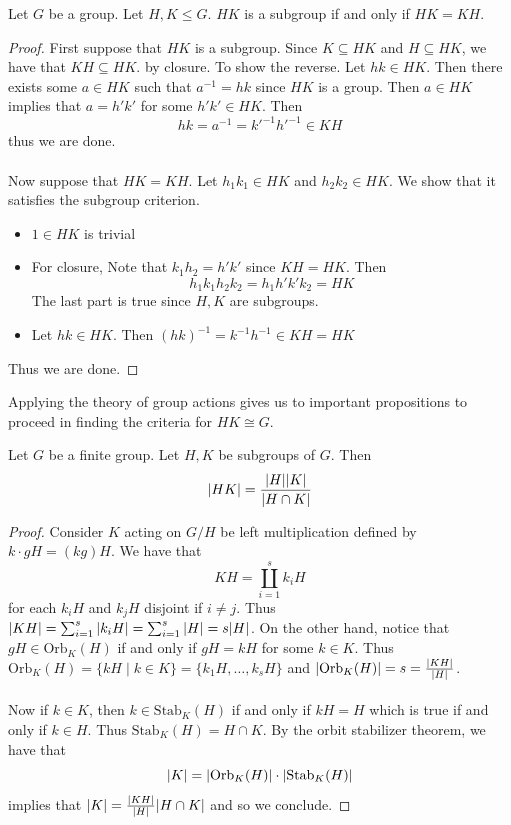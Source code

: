 \documentclass[a4paper]{article}
\begin{document}
\begin{thm}{}{} Let $G$ be a group. Let $H,K\leq G$. $HK$ is a subgroup if and only if $HK=KH$. \tcbline
\begin{proof}
First suppose that $HK$ is a subgroup. Since $K\subseteq HK$ and $H\subseteq HK$, we have that $KH\subseteq HK$. by closure. To show the reverse. Let $hk\in HK$. Then there exists some $a\in HK$ such that $a^{-1}=hk$ since $HK$ is a group. Then $a\in HK$ implies that $a=h'k'$ for some $h'k'\in HK$. Then $$hk=a^{-1}=k'^{-1}h'^{-1}\in KH$$ thus we are done. \\~\\
Now suppose that $HK=KH$. Let $h_1k_1\in HK$ and $h_2k_2\in HK$. We show that it satisfies the subgroup criterion. 
\begin{itemize}
\item $1\in HK$ is trivial
\item For closure, Note that $k_1h_2=h'k'$ since $KH=HK$. Then $$h_1k_1h_2k_2=h_1h'k'k_2=HK$$ The last part is true since $H,K$ are subgroups. 
\item Let $hk\in HK$. Then $(hk)^{-1}=k^{-1}h^{-1}\in KH=HK$
\end{itemize}
Thus we are done. 
\end{proof}
\end{thm}

Applying the theory of group actions gives us to important propositions to proceed in finding the criteria for $HK\cong G$. 

\begin{prp}{}{} Let $G$ be a finite group. Let $H,K$ be subgroups of $G$. Then $$\abs{HK}=\frac{\abs{H}\abs{K}}{\abs{H\cap K}}$$ \tcbline
\begin{proof}
Consider $K$ acting on $G/H$ be left multiplication defined by $k\cdot gH=(kg)H$. We have that $$KH=\coprod_{i=1}^sk_iH$$ for each $k_iH$ and $k_jH$ disjoint if $i\neq j$. Thus $\abs{KH}=\sum_{i=1}^s\abs{k_iH}=\sum_{i=1}^s\abs{H}=s\abs{H}$. On the other hand, notice that $gH\in\text{Orb}_K(H)$ if and only if $gH=kH$ for some $k\in K$. Thus $\text{Orb}_K(H)=\{kH\;|\;k\in K\}=\{k_1H,\dots,k_sH\}$ and $\abs{\text{Orb}_K(H)}=s=\frac{\abs{KH}}{\abs{H}}$. \\~\\

Now if $k\in K$, then $k\in\text{Stab}_K(H)$ if and only if $kH=H$ which is true if and only if $k\in H$. Thus $\text{Stab}_K(H)=H\cap K$. By the orbit stabilizer theorem, we have that $$\abs{K}=\abs{\text{Orb}_K(H)}\cdot\abs{\text{Stab}_K(H)}$$ implies that $\abs{K}=\frac{\abs{KH}}{\abs{H}}\abs{H\cap K}$ and so we conclude. 
\end{proof}
\end{prp}
\end{document}
